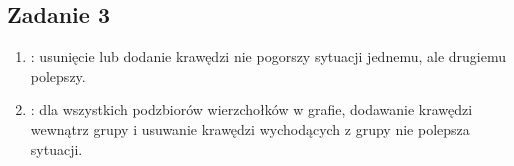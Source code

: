 \subsection{Zadanie 3}
\begin{enumerate}
 \item
     : usunięcie lub dodanie krawędzi nie pogorszy
        sytuacji jednemu, ale drugiemu polepszy.
 \item
     : dla wszystkich podzbiorów wierzchołków w
        grafie, dodawanie krawędzi wewnątrz grupy i usuwanie krawędzi
        wychodących z grupy nie polepsza sytuacji.
\end{enumerate}

